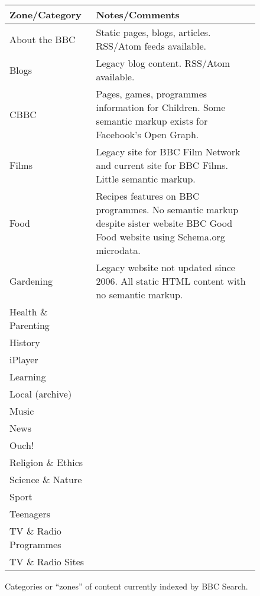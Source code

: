 \begin{sidewaysfigure}
  \centering
\begin{tabular}{| p{5cm} | p{16cm} |}
  \hline
  Zone/Category          & Notes/Comments \\
  \hline
  About the BBC          &  Static pages, blogs, articles. RSS/Atom feeds available. \\
  \hline
  Blogs                  &  Legacy blog content. RSS/Atom available. \\
  \hline
  CBBC                   &  Pages, games, programmes information for Children. Some semantic markup exists for Facebook's Open Graph. \\
  \hline
  Films                  &  Legacy site for BBC Film Network and current site for BBC Films. Little semantic markup. \\
  \hline
  Food                   &  Recipes features on BBC programmes. No semantic markup despite sister website BBC Good Food website using Schema.org microdata. \\
  \hline
  Gardening              &  Legacy website not updated since 2006. All static HTML content with no semantic markup. \\
  \hline
  Health \& Parenting    &  \\
  \hline
  History                &  \\
  \hline
  iPlayer                &  \\
  \hline
  Learning               &  \\
  \hline
  Local (archive)        &  \\
  \hline
  Music                  &  \\
  \hline
  News                   &  \\
  \hline
  Ouch!                  &  \\
  \hline
  Religion \& Ethics     &  \\
  \hline
  Science \& Nature      &  \\
  \hline
  Sport                  &  \\
  \hline
  Teenagers              &  \\
  \hline
  TV \& Radio Programmes &  \\
  \hline
  TV \& Radio Sites      &  \\
  \hline
\end{tabular}
\caption{Categories or ``zones'' of content currently indexed by BBC Search.}
\label{zones-table}
\end{sidewaysfigure}

